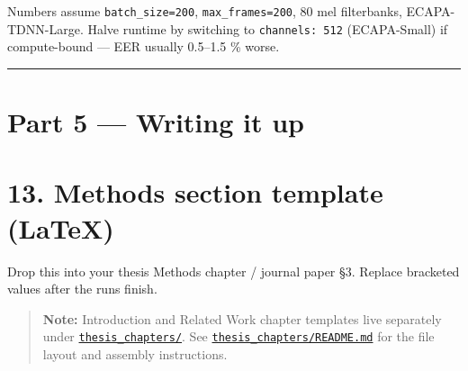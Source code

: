 \documentclass[10pt,a4paper]{article}
\begin{document}
Numbers assume \texttt{batch\_size=200}, \texttt{max\_frames=200}, 80 mel filterbanks, ECAPA-TDNN-Large. Halve runtime by switching to \texttt{channels: 512} (ECAPA-Small) if compute-bound --- EER usually 0.5--1.5 \% worse.

\vspace{0.5em}\hrule\vspace{0.5em}

\section*{Part 5 --- Writing it up}

\section*{13. Methods section template (LaTeX)}

Drop this into your thesis Methods chapter / journal paper §3. Replace bracketed values after the runs finish.

\begin{quote}
\textbf{Note:} Introduction and Related Work chapter templates live separately under \href{thesis_chapters/}{\texttt{thesis\_chapters/}}. See \href{thesis_chapters/README.md}{\texttt{thesis\_chapters/README.md}} for the file layout and assembly instructions.
\end{quote}
\end{document}
